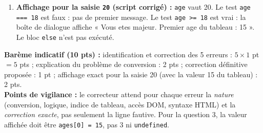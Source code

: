 \documentclass[11pt]{article}
\begin{document}
\begin{corrige}
\begin{enumerate}
\item \textbf{Affichage pour la saisie \texttt{20} (script corrigé) :} \texttt{age} vaut 20. Le test \texttt{age === 18} est faux : pas de premier message. Le test \texttt{age >= 18} est vrai : la boîte de dialogue affiche « Vous etes majeur. Premier age du tableau : 15 ». Le bloc \texttt{else} n'est pas exécuté.
\end{enumerate}
\textbf{Barème indicatif (10 pts) :} identification et correction des 5 erreurs : $5 \times 1$ pt $= 5$ pts ; explication du problème de conversion : 2 pts ; correction définitive proposée : 1 pt ; affichage exact pour la saisie 20 (avec la valeur 15 du tableau) : 2 pts.\\
\textbf{Points de vigilance :} le correcteur attend pour chaque erreur la \emph{nature} (conversion, logique, indice de tableau, accès DOM, syntaxe HTML) et la \emph{correction exacte}, pas seulement la ligne fautive. Pour la question 3, la valeur affichée doit être \texttt{ages[0] = 15}, pas 3 ni \texttt{undefined}.
\end{corrige}
\end{document}
